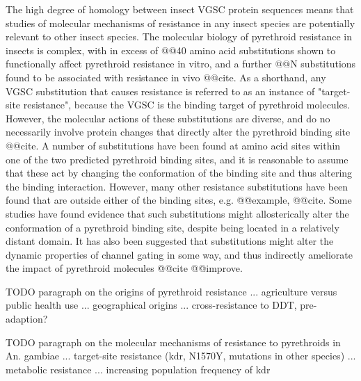 %
The high degree of homology between insect VGSC protein sequences means that studies of molecular mechanisms of resistance in any insect species are potentially relevant to other insect species.
%
The molecular biology of pyrethroid resistance in insects is complex, with in excess of @@40 amino acid substitutions shown to functionally affect pyrethroid resistance in vitro, and a further @@N substitutions found to be associated with resistance in vivo @@cite.
%
As a shorthand, any VGSC substitution that causes resistance is referred to as an instance of "target-site resistance", because the VGSC is the binding target of pyrethroid molecules.
%
However, the molecular actions of these substitutions are diverse, and do no necessarily involve protein changes that directly alter the pyrethroid binding site @@cite.
%
A number of substitutions have been found at amino acid sites within one of the two predicted pyrethroid binding sites, and it is reasonable to assume that these act by changing the conformation of the binding site and thus altering the binding interaction.
%
However, many other resistance substitutions have been found that are outside either of the binding sites, e.g. @@example, @@cite.
%
Some studies have found evidence that such substitutions might allosterically alter the conformation of a pyrethroid binding site, despite being located in a relatively distant domain.
%
It has also been suggested that substitutions might alter the dynamic properties of channel gating in some way, and thus indirectly ameliorate the impact of pyrethroid molecules @@cite @@improve.

TODO paragraph on the origins of pyrethroid resistance ... agriculture versus public health use ... geographical origins ... cross-resistance to DDT, pre-adaption?


TODO paragraph on the molecular mechanisms of resistance to pyrethroids in An.  gambiae ... target-site resistance (kdr, N1570Y, mutations in other species) ... metabolic resistance ... increasing population frequency of kdr

